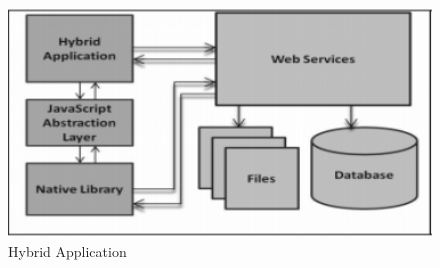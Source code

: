 \begin{figure}[h!]
	\caption{Hybrid Application}
	\label{image:myImageName}
	\centering
	\includegraphics[width=1\textwidth]{Images/hybrid_dev_img.PNG}
\end{figure}
